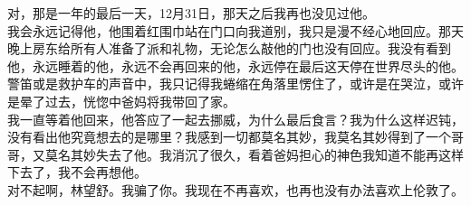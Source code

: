 \documentclass[letterpaper, 12pt]{article}
\begin{document}
\begin{multicols}{2}
对，那是一年的最后一天，12月31日，那天之后我再也没见过他。\\

我会永远记得他，他围着红围巾站在门口向我道别，我只是漫不经心地回应。那天晚上房东给所有人准备了派和礼物，无论怎么敲他的门也没有回应。我没有看到他，永远睡着的他，永远不会再回来的他，永远停在最后这天停在世界尽头的他。警笛或是救护车的声音中，我只记得我蜷缩在角落里愣住了，或许是在哭泣，或许是晕了过去，恍惚中爸妈将我带回了家。\\

我一直等着他回来，他答应了一起去挪威，为什么最后食言？我为什么这样迟钝，没有看出他究竟想去的是哪里？我感到一切都莫名其妙，我莫名其妙得到了一个哥哥，又莫名其妙失去了他。我消沉了很久，看着爸妈担心的神色我知道不能再这样下去了，我不会再想他。\\

对不起啊，林望舒。我骗了你。我现在不再喜欢，也再也没有办法喜欢上伦敦了。\\


\end{multicols} 
\end{document}
